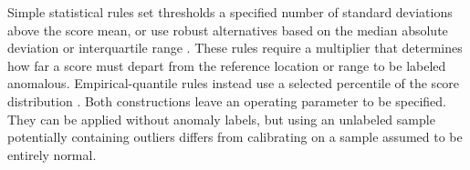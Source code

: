Simple statistical rules set thresholds a specified number of standard deviations above the score mean, or use robust alternatives based on the median absolute deviation or interquartile range \cite{outlier_thresholding}. These rules require a multiplier that determines how far a score must depart from the reference location or range to be labeled anomalous. Empirical-quantile rules instead use a selected percentile of the score distribution \cite{ruff_review_2021}. Both constructions leave an operating parameter to be specified. They can be applied without anomaly labels, but using an unlabeled sample potentially containing outliers differs from calibrating on a sample assumed to be entirely normal.
